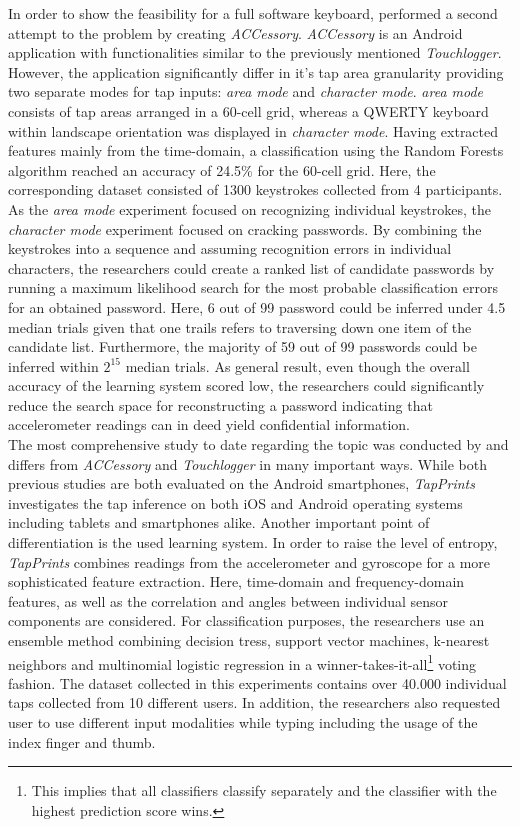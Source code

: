 In order to show the feasibility for a full software keyboard, \citeauthor{Accessory} performed a second attempt to the problem by creating \textit{ACCessory}. \textit{ACCessory} is an Android application with functionalities similar to the previously mentioned \textit{Touchlogger}. However, the application significantly differ in it's tap area granularity providing two separate modes for tap inputs: \textit{area mode} and \textit{character mode}. \textit{area mode} consists of tap areas arranged in a 60-cell grid, whereas a QWERTY keyboard within landscape orientation was displayed in \textit{character mode}. Having extracted features mainly from the time-domain, a classification using the Random Forests algorithm reached an accuracy of 24.5\% for the 60-cell grid. Here, the corresponding dataset consisted of 1300 keystrokes collected from 4 participants. As the \textit{area mode} experiment focused on recognizing individual keystrokes, the \textit{character mode} experiment focused on cracking passwords. By combining the keystrokes into a sequence and assuming recognition errors in individual characters, the researchers could create a ranked list of candidate passwords by running a maximum likelihood search for the most probable classification errors for an obtained password. Here, 6 out of 99 password could be inferred under 4.5 median trials given that one trails refers to traversing down one item of the candidate list. Furthermore, the majority of 59 out of 99 passwords could be inferred within $2^{15}$ median trials. As general result, even though the overall accuracy of the learning system scored low, the researchers could significantly reduce the search space for reconstructing a password indicating that accelerometer readings can in deed yield confidential information. \\

The most comprehensive study to date regarding the topic was conducted by \citeauthor{Tapprints} and differs from \textit{ACCessory} and \textit{Touchlogger} in many important ways. While both previous studies are both evaluated on the Android smartphones, \textit{TapPrints} investigates the tap inference on both iOS and Android operating systems including tablets and smartphones alike. Another important point of differentiation is the used learning system. In order to raise the level of entropy, \textit{TapPrints} combines readings from the accelerometer and gyroscope for a more sophisticated feature extraction. Here, time-domain and frequency-domain features, as well as the correlation and angles between individual sensor components are considered. For classification purposes, the researchers use an ensemble method combining decision tress, support vector machines, k-nearest neighbors and multinomial logistic regression in a winner-takes-it-all\footnote{This implies that all classifiers classify separately and the classifier with the highest prediction score wins.} voting fashion. The dataset collected in this experiments contains over 40.000 individual taps collected from 10 different users. In addition, the researchers also requested user to use different input modalities while typing including the usage of the index finger and thumb.\\

